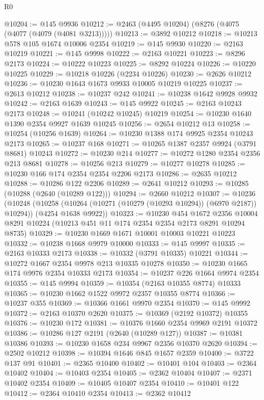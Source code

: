 \begin{lexlean}{R0}
\begin{coremodule}
@10204 := @145 @9936
@10212 := @2463 (@4495 @10204) (@8276 (@4075 (@4077 (@4079 (@4081 @3213)))))
@10213 := @3892 @10212
@10218 := @10213 @578 @105 @1674 @10006 @2354
@10219 := @145 @9930
@10220 := @2163 @10219
@10221 := @145 @9998
@10222 := @2163 @10221
@10223 := @8296 @2173
@10224 := @10222 @10223
@10225 := @8292 @10224
@10226 := @10220 @10225
@10229 := @10218 @10226 (@2234 @10226)
@10230 := @2626 @10212
@10236 := @10230 @1643 @1673 @9933 @10005 @10219 @10225
@10237 := @2613 @10212
@10238 := @10237 @242
@10241 := @10238 @1642 @9928 @9932
@10242 := @2163 @1639
@10243 := @145 @9922
@10245 := @2163 @10243 @2173
@10248 := @10241 (@10242 @10245) @10219
@10254 := @10230 @1640 @1390 @2354 @9927 @1639 @10245
@10256 := @2654 @10212 @13
@10258 := @10254 (@10256 @1639)
@10264 := @10230 @1388 @174 @9925 @2354 @10243 @2173
@10265 := @10237 @168
@10271 := @10265 @1387 @2357 @9924 (@3791 @8681) @10243
@10272 := @10230 @214
@10277 := @10272 @1280 @2354 @2356 @213 @8681
@10278 := @10256 @213
@10279 := @10277 @10278
@10285 := @10230 @166 @174 @2354 @2354 @2206 @2173
@10286 := @2635 @10212
@10288 := @10286 @122 @2206
@10289 := @2641 @10212
@10293 := @10285 (@10288 (@2640 (@10289 @122)))
@10294 := @2660 @10212
@10307 := @10236
    (@10248
      (@10258 (@10264 (@10271 (@10279 (@10293 @10294)) (@6970 @2187)) @10294))
      (@4254 @1638 @9922))
@10323 := @10230
    @454
    @1672
    @2356
    @10004
    @8291
    @10224
    (@10213 @451 @11 @174 @2354 @2354 @2173 @8291 @10294 @8735)
@10329 := @10230 @1669 @1671 @10001 @10003 @10221 @10223
@10332 := @10238 @1668 @9979 @10000
@10333 := @145 @9997
@10335 := @2163 @10333 @2173
@10338 := @10332 (@3791 @10335) @10221
@10344 := @10272 @1667 @2354 @9978 @213 @10335 @10278
@10350 := @10230 @1665 @174 @9976 @2354 @10333 @2173
@10354 := @10237 @226 @1664 @9974 @2354
@10355 := @145 @9994
@10359 := @10354 (@2163 @10355 @8774) @10333
@10365 := @10230 @1662 @1522 @9972 @2357 @10355 @8774
@10366 := @10237 @355
@10369 := @10366 @1661 @9970 @2354
@10370 := @145 @9992
@10372 := @2163 @10370 @2620
@10375 := @10369 (@2192 @10372) @10355
@10376 := @10230 @172
@10381 := @10376 @1660 @2354 @9969 @2191 @10372
@10386 := @10286 @127 @2191 (@2640 (@10289 @127))
@10387 := @10381 @10386
@10393 := @10230 @1658 @234 @9967 @2356 @10370 @2620
@10394 := @2502 @10212
@10398 := @10394 @1646 @845 @1657 @2359
@10400 := @3722 @137 @91
@10401 := @2365 @10400
@10402 := @10401 @104
@10403 := @2364 @10402
@10404 := @10403 @2354
@10405 := @2362 @10404
@10407 := @2371 @10402 @2354
@10409 := @10405 @10407 @2354
@10410 := @10401 @122
@10412 := @2364 @10410 @2354
@10413 := @2362 @10412

\end{coremodule}
\end{lexlean}
